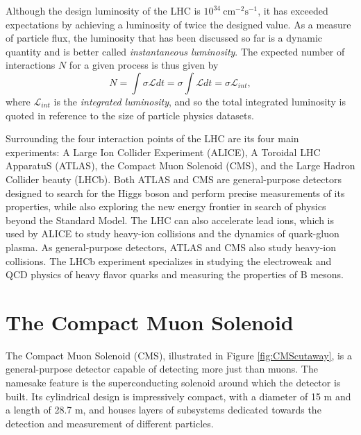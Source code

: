 Although the design luminosity of the LHC is $10^{34}\ \mathrm{cm}^{-2} \mathrm{s}^{-1}$, it has exceeded expectations by achieving a luminosity of twice the designed value. As a measure of particle flux, the luminosity that has been discussed so far is a dynamic quantity and is better called \textit{instantaneous luminosity}. The expected number of interactions $N$ for a given process is thus given by
\begin{equation}
  N = \int \sigma\mathcal{L}dt = \sigma \int \mathcal{L}dt = \sigma \mathcal{L}_{int},
\end{equation}
where $\mathcal{L}_{int}$ is the \textit{integrated luminosity}, and so the total integrated luminosity is quoted in reference to the size of particle physics datasets.

Surrounding the four interaction points of the LHC are its four main experiments: A Large Ion Collider Experiment (ALICE), A Toroidal LHC ApparatuS (ATLAS), the Compact Muon Solenoid (CMS), and the Large Hadron Collider beauty (LHCb). Both ATLAS and CMS are general-purpose detectors designed to search for the Higgs boson and perform precise measurements of its properties, while also exploring the new energy frontier in search of physics beyond the Standard Model. The LHC can also accelerate lead ions, which is used by ALICE to study heavy-ion collisions and the dynamics of quark-gluon plasma. As general-purpose detectors, ATLAS and CMS also study heavy-ion collisions. The LHCb experiment specializes in studying the electroweak and QCD physics of heavy flavor quarks and measuring the properties of B mesons.

\section{The Compact Muon Solenoid}

The Compact Muon Solenoid (CMS), illustrated in Figure \ref{fig:CMScutaway}, is a general-purpose detector capable of detecting more just than muons. The namesake feature is the superconducting solenoid around which the detector is built. Its cylindrical design is impressively compact, with a diameter of 15 m and a length of 28.7 m, and houses layers of subsystems dedicated towards the detection and measurement of different particles.

